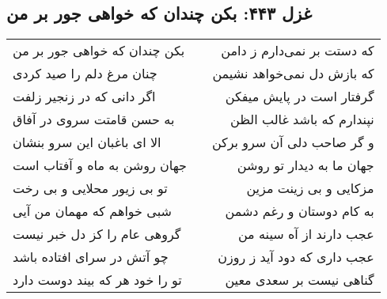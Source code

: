 \begin{center}
\section*{غزل ۴۴۳: بکن چندان که خواهی جور بر من}
\label{sec:443}
\begin{longtable}{l p{0.5cm} r}
بکن چندان که خواهی جور بر من
&&
که دستت بر نمی‌دارم ز دامن
\\
چنان مرغ دلم را صید کردی
&&
که بازش دل نمی‌خواهد نشیمن
\\
اگر دانی که در زنجیر زلفت
&&
گرفتار است در پایش میفکن
\\
به حسن قامتت سروی در آفاق
&&
نپندارم که باشد غالب الظن
\\
الا ای باغبان این سرو بنشان
&&
و گر صاحب دلی آن سرو برکن
\\
جهان روشن به ماه و آفتاب است
&&
جهان ما به دیدار تو روشن
\\
تو بی زیور محلایی و بی رخت
&&
مزکایی و بی زینت مزین
\\
شبی خواهم که مهمان من آیی
&&
به کام دوستان و رغم دشمن
\\
گروهی عام را کز دل خبر نیست
&&
عجب دارند از آه سینه من
\\
چو آتش در سرای افتاده باشد
&&
عجب داری که دود آید ز روزن
\\
تو را خود هر که بیند دوست دارد
&&
گناهی نیست بر سعدی معین
\\
\end{longtable}
\end{center}
